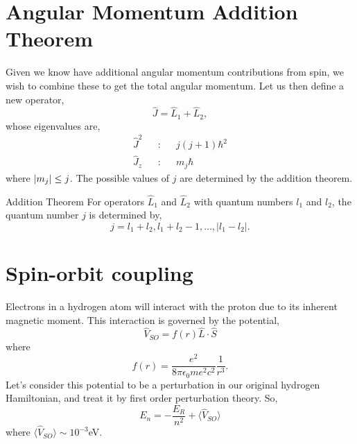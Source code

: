 \documentclass{book}
\begin{document}
\section{Angular Momentum Addition Theorem}
Given we know have additional angular momentum contributions from spin, we wish to combine these to get the total angular momentum. Let us then define a new operator,
\begin{equation}
	\hat{J} = \hat{L}_1 + \hat{L}_2,
\end{equation}
whose eigenvalues are, 
\begin{align}
	\hat{J}^2 && : && j(j+1)\hbar^2 \\
	\hat{J}_z && : && m_j\hbar
\end{align}
where $\abs{m_j} \leq j$. The possible values of $j$ are determined by the addition theorem.
\begin{Theorems}{Addition Theorem}{}
	For operators $\hat{L}_1$ and $\hat{L}_2$ with quantum numbers $l_1$ and $l_2$, the quantum number $j$ is determined by,
	\begin{equation}
		j = l_1 + l_2, l_1 + l_2 - 1, \ldots, |l_1 - l_2|.
	\end{equation}
\end{Theorems}
\section{Spin-orbit coupling}
Electrons in a hydrogen atom will interact with the proton due to its inherent magnetic moment. This interaction is governed by the potential,
\begin{equation}
	\hat{V}_{SO} = f(r) \hat{L}\cdot\hat{S}
\end{equation}
where 
\begin{equation}
	f(r) = \frac{e^2}{8\pi\epsilon_0 me^2c^2}\frac{1}{r^3}.
\end{equation}
Let's consider this potential to be a perturbation in our original hydrogen Hamiltonian, and treat it by first order perturbation theory. So,
\begin{equation}
	E_n = -\frac{E_R}{n^2} + \langle \hat{V}_{SO}\rangle
\end{equation}
where $\langle \hat{V}_{SO}\rangle \sim 10^{-3}$eV.
\end{document}
